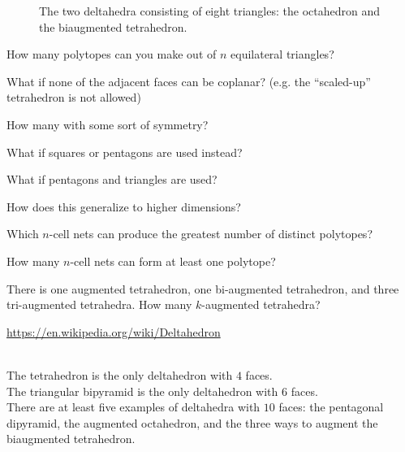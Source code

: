 \documentclass{article}
\begin{document}
\begin{figure}[ht!]
{  }
  \caption{The two deltahedra consisting of eight triangles: the octahedron and the biaugmented tetrahedron.}
\end{figure}

\begin{question}
  How many polytopes can you make out of $n$ equilateral triangles?
\end{question}

\begin{related}
  \item What if none of the adjacent faces can be coplanar?
    (e.g. the ``scaled-up'' tetrahedron is not allowed)
  \item How many with some sort of symmetry?
  \item What if squares or pentagons are used instead?
  \item What if pentagons and triangles are used?
  \item How does this generalize to higher dimensions?
  \item Which $n$-cell nets can produce the greatest number of distinct polytopes?
  \item How many $n$-cell nets can form at least one polytope?
  \item There is one augmented tetrahedron, one bi-augmented tetrahedron,
    and three tri-augmented tetrahedra. How many $k$-augmented tetrahedra?
\end{related}

\begin{references}
  \item \url{https://en.wikipedia.org/wiki/Deltahedron}
\end{references}

\begin{note} ~ \\
  The tetrahedron is the only deltahedron with $4$ faces.\\
  The triangular bipyramid is the only deltahedron with $6$ faces.\\
  There are at least five examples of deltahedra with $10$ faces:
  the pentagonal dipyramid,
  the augmented octahedron,
  and the three ways to augment the biaugmented tetrahedron.
\end{note}
\end{document}
